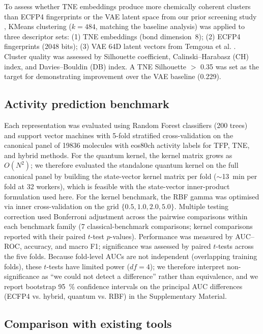 \documentclass[11pt,a4paper]{article}
\begin{document}
To assess whether TNE embeddings produce more chemically coherent clusters than ECFP4 fingerprints or the VAE latent space from our prior screening study \citep{temgoua2026antimalarial}, KMeans clustering ($k = 484$, matching the baseline analysis) was applied to three descriptor sets: (1) TNE embeddings (bond dimension~8); (2) ECFP4 fingerprints (\num{2048} bits); (3) VAE 64D latent vectors from Temgoua et al. \citep{temgoua2026antimalarial}. Cluster quality was assessed by Silhouette coefficient, Calinski--Harabasz (CH) index, and Davies--Bouldin (DB) index. A TNE Silhouette $>$ \num{0.35} was set as the target for demonstrating improvement over the VAE baseline (\num{0.229}).

\subsection{Activity prediction benchmark}

Each representation was evaluated using Random Forest classifiers (\num{200} trees) and support vector machines with 5-fold stratified cross-validation on the canonical panel of \num{19836} molecules with eos80ch activity labels for TFP, TNE, and hybrid methods. For the quantum kernel, the kernel matrix grows as $O(N^2)$; we therefore evaluated the standalone quantum kernel on the full canonical panel by building the state-vector kernel matrix per fold ($\sim$\SI{13}{\minute} per fold at 32 workers), which is feasible with the state-vector inner-product formulation used here. For the kernel benchmark, the RBF gamma was optimised via inner cross-validation on the grid $\{0.5, 1.0, 2.0, 5.0\}$. Multiple testing correction used Bonferroni adjustment across the pairwise comparisons within each benchmark family (7 classical-benchmark comparisons; kernel comparisons reported with their paired $t$-test $p$-values). Performance was measured by AUC--ROC, accuracy, and macro F1; significance was assessed by paired $t$-tests across the five folds. Because fold-level AUCs are not independent (overlapping training folds), these $t$-tests have limited power ($df = 4$); we therefore interpret non-significance as ``we could not detect a difference'' rather than equivalence, and we report bootstrap \qty{95}{\percent} confidence intervals on the principal AUC differences (ECFP4 vs. hybrid, quantum vs. RBF) in the Supplementary Material.

\subsection{Comparison with existing tools}
\end{document}
